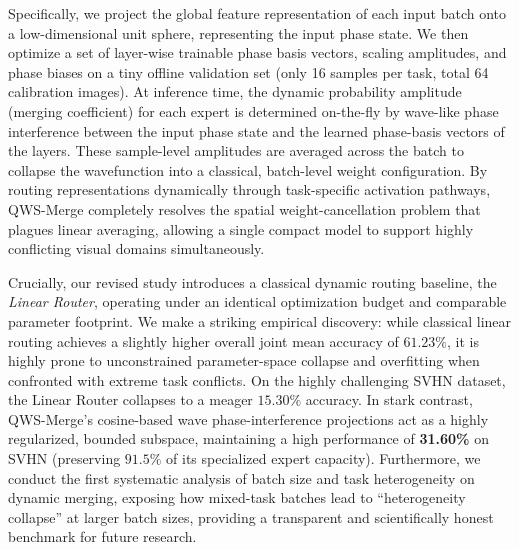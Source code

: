 Specifically, we project the global feature representation of each input batch onto a low-dimensional unit sphere, representing the input phase state. We then optimize a set of layer-wise trainable phase basis vectors, scaling amplitudes, and phase biases on a tiny offline validation set (only 16 samples per task, total 64 calibration images). At inference time, the dynamic probability amplitude (merging coefficient) for each expert is determined on-the-fly by wave-like phase interference between the input phase state and the learned phase-basis vectors of the layers. These sample-level amplitudes are averaged across the batch to collapse the wavefunction into a classical, batch-level weight configuration. By routing representations dynamically through task-specific activation pathways, QWS-Merge completely resolves the spatial weight-cancellation problem that plagues linear averaging, allowing a single compact model to support highly conflicting visual domains simultaneously.

Crucially, our revised study introduces a classical dynamic routing baseline, the \emph{Linear Router}, operating under an identical optimization budget and comparable parameter footprint. We make a striking empirical discovery: while classical linear routing achieves a slightly higher overall joint mean accuracy of $61.23\%$, it is highly prone to unconstrained parameter-space collapse and overfitting when confronted with extreme task conflicts. On the highly challenging SVHN dataset, the Linear Router collapses to a meager $15.30\%$ accuracy. In stark contrast, QWS-Merge's cosine-based wave phase-interference projections act as a highly regularized, bounded subspace, maintaining a high performance of \textbf{31.60\%} on SVHN (preserving $91.5\%$ of its specialized expert capacity). Furthermore, we conduct the first systematic analysis of batch size and task heterogeneity on dynamic merging, exposing how mixed-task batches lead to ``heterogeneity collapse'' at larger batch sizes, providing a transparent and scientifically honest benchmark for future research.

